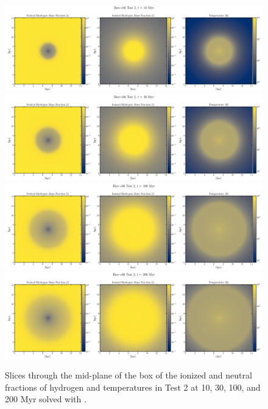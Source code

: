 \begin{figure}
 \centering
 \includegraphics[width=\textwidth]{figures/RHD/Iliev2/output_0001-NoRef.png}\\%
 \includegraphics[width=\textwidth]{figures/RHD/Iliev2/output_0003-NoRef.png}\\%
 \includegraphics[width=\textwidth]{figures/RHD/Iliev2/output_0010-NoRef.png}\\%
 \includegraphics[width=\textwidth]{figures/RHD/Iliev2/output_0020-NoRef.png}%
 \caption{
Slices through the mid-plane of the box of the ionized and neutral fractions of hydrogen and
temperatures in Test 2 at 10, 30, 100, and 200 Myr solved with \GEARRT.
 }
 \label{fig:iliev2-slices}
\end{figure}





